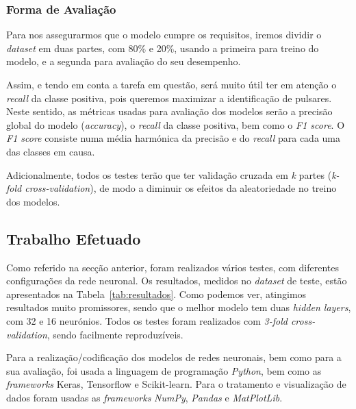 \documentclass[]{article}
\begin{document}
\subsubsection{Forma de Avaliação}
\label{sec:avaliacao}
Para nos assegurarmos que o modelo cumpre os requisitos, iremos dividir o \textit{dataset} em duas partes, com 80\% e 20\%, usando a primeira para treino do modelo, e a segunda para avaliação do seu desempenho.

Assim, e tendo em conta a tarefa em questão, será muito útil ter em atenção o \textit{recall} da classe positiva, pois queremos maximizar a identificação de pulsares. Neste sentido, as métricas usadas para avaliação dos modelos serão a precisão global do modelo (\textit{accuracy}), o \textit{recall} da classe positiva, bem como o \textit{F1 score}. O \textit{F1 score} consiste numa média harmónica da precisão e do \textit{recall} para cada uma das classes em causa.

Adicionalmente, todos os testes terão que ter validação cruzada em \textit{k} partes (\textit{k-fold cross-validation}), de modo a diminuir os efeitos da aleatoriedade no treino dos modelos.

\subsection{Trabalho Efetuado}
\label{sec:trabalho}
Como referido na secção anterior, foram realizados vários testes, com diferentes configurações da rede neuronal. Os resultados, medidos no \textit{dataset} de teste, estão apresentados na Tabela~\ref{tab:resultados}. Como podemos ver, atingimos resultados muito promissores, sendo que o melhor modelo tem duas \textit{hidden layers}, com 32 e 16 neurónios. Todos os testes foram realizados com \textit{3-fold cross-validation}, sendo facilmente reproduzíveis.

Para a realização/codificação dos modelos de redes neuronais, bem como para a sua avaliação, foi usada a linguagem de programação \textit{Python}, bem como as \textit{frameworks} Keras, Tensorflow e Scikit-learn. Para o tratamento e visualização de dados foram usadas as \textit{frameworks} \textit{NumPy}, \textit{Pandas} e \textit{MatPlotLib}.
\end{document}
